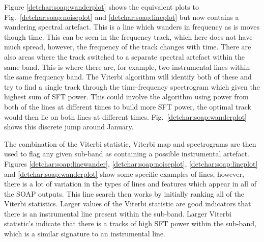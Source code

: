 Figure \ref{detchar:soap:wanderplot} shows the equivalent plots to
Fig.~\ref{detchar:soap:noiseplot} and \ref{detchar:soap:lineplot} but now
contains a wandering spectral artefact.  This is
a line which wanders in
frequency as is moves though time.  This can be seen in the frequency
track, which here does not have much spread, however, the frequency of the
track changes with time.  There are also areas where the track switched to a separate spectral artefact within the same
band. This is where there are, for example, two instrumental lines within the same frequency band. The Viterbi algorithm will identify both of these and try to find a single track through the time-frequency spectrogram which given the highest sum of \gls{SFT} power. This could involve the algorithm using power from both of the lines at different times to build more \gls{SFT} power, the optimal track would then lie on both lines at different times. Fig.~\ref{detchar:soap:wanderplot} shows this discrete jump around
January.~ 

The combination of the Viterbi statistic, Viterbi map and spectrograms are then
used to flag any given sub-band as
containing a possible instrumental
artefact.  Figures \ref{detchar:soap:linewander},
\ref{detchar:soap:noiseplot}, \ref{detchar:soap:lineplot} and
\ref{detchar:soap:wanderplot} show some specific
examples of lines, however, there is a lot of variation in the types of lines and
features which appear in all of the SOAP outputs.  This line search then works
by initially ranking all of the Viterbi statistics.
Larger values of the Viterbi statistic are good indicators that there is an instrumental line present within the sub-band. 
Larger Viterbi statistic's indicate that there is a tracks of high \gls{SFT} power within the sub-band, which is a similar signature to an instrumental line.


